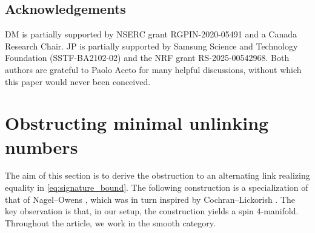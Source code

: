 \documentclass[a4paper,11pt]{amsart}
\theoremstyle{definition}
\theoremstyle{remark}
\numberwithin{equation}{section}
\begin{document}
\subsection*{Acknowledgements}
DM is partially supported by NSERC grant RGPIN-2020-05491 and a Canada Research Chair. JP is partially supported by Samsung Science and Technology Foundation (SSTF-BA2102-02) and the NRF grant RS-2025-00542968. Both authors are grateful to Paolo Aceto for many helpful discussions, without which this paper would never been conceived.

\section{Obstructing minimal unlinking numbers}
The aim of this section is to derive the obstruction to an alternating link realizing equality in \eqref{eq:signature_bound}.
The following construction is a specialization of that of Nagel--Owens \cite[Proposition~2.3]{NagelOwens}, which was in turn inspired by Cochran--Lickorish \cite{CochranLickorish}. The key observation is that, in our setup, the construction yields a spin $4$-manifold. Throughout the article, we work in the smooth category.
\end{document}
